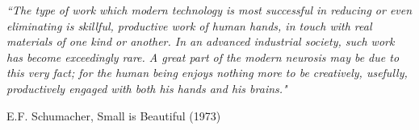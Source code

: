 \pagestyle{empty}  %

\null\vfill
\textit{``The type of work which modern technology is most successful in reducing or even eliminating is skillful, productive work of human hands, in touch with real materials of one kind or another. In an advanced industrial society, such work has become exceedingly rare. A great part of the modern neurosis may be due to this very fact; for the human being enjoys nothing more to be creatively, usefully, productively engaged with both his hands and his brains."
}

\begin{flushright}
E.F. Schumacher, Small is Beautiful (1973)
\end{flushright}

\vfill\vfill\vfill\vfill\vfill\vfill\null
\clearpage  %
